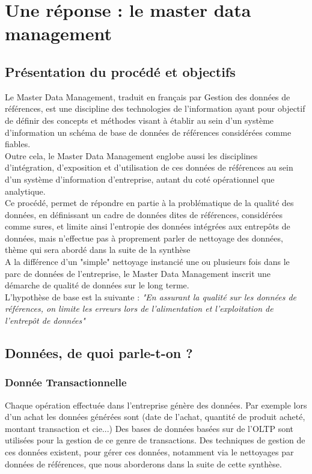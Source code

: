 \section{Une réponse : le master data management}

\subsection{Présentation du procédé et objectifs} 

Le Master Data Management, traduit en français par Gestion des données de références, est une discipline des technologies de l'information ayant pour objectif de définir des concepts et méthodes visant à établir au sein d'un système d'information un schéma de base de données de références considérées comme fiables.\\
Outre cela, le Master Data Management englobe aussi les disciplines d'intégration, d'exposition et d'utilisation de ces données de références au sein d'un système d'information d'entreprise, autant du coté opérationnel que analytique.\\
Ce procédé, permet de répondre en partie à la problématique de la qualité des données, en définissant un cadre de données dites de références, considérées comme sures, et limite ainsi l'entropie des données intégrées aux entrepôts de données, mais n'effectue pas à proprement parler de nettoyage des données, thème qui sera abordé dans la suite de la synthèse\\
A la différence d'un "simple" nettoyage instancié une ou plusieurs fois dans le parc de données de l'entreprise, le Master Data Management inscrit une démarche de qualité de données sur le long terme.\\

L'hypothèse de base est la suivante : \textit{"En assurant la qualité sur les données de références, on limite les erreurs lors de l'alimentation et l'exploitation de l'entrepôt de données"}\\

\subsection{Données, de quoi parle-t-on ?}

\subsubsection{Donnée Transactionnelle}

Chaque opération effectuée dans l'entreprise génère des données. Par exemple lors d'un achat
les données générées sont (date de l'achat, quantité de produit acheté, montant transaction et cie...)
Des bases de données basées sur de l'OLTP sont utilisées pour la gestion de ce genre de transactions.
Des techniques de gestion de ces données existent, pour gérer ces données, notamment via le nettoyages par données de références, que nous aborderons dans la suite de cette synthèse.

